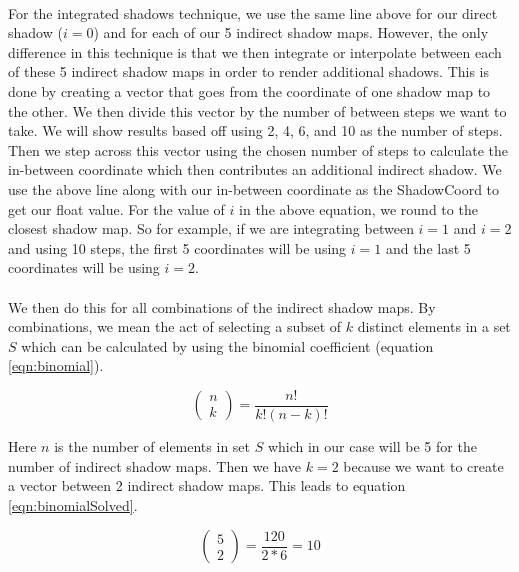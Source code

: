 \paragraph{}
For the integrated shadows technique, we use the same line above for our direct shadow ($i=0$) and for each of our 5 indirect shadow maps.  However, the only difference in this technique is that we then integrate or interpolate between each of these 5 indirect shadow maps in order to render additional shadows.  This is done by creating a vector that goes from the coordinate of one shadow map to the other.  We then divide this vector by the number of between steps we want to take.  We will show results based off using 2, 4, 6, and 10 as the number of steps. Then we step across this vector using the chosen number of steps to calculate the in-between coordinate which then contributes an additional indirect shadow.  We use the above line along with our in-between coordinate as the ShadowCoord to get our float value.  For the value of $i$ in the above equation, we round to the closest shadow map. So for example, if we are integrating between $i=1$ and $i=2$ and using 10 steps, the first 5 coordinates will be using $i=1$ and the last 5 coordinates will be using $i=2$.

\paragraph{}
We then do this for all combinations of the indirect shadow maps.  By combinations, we mean the act of selecting a subset of $k$ distinct elements in a set $S$ which can be calculated by using the binomial coefficient (equation \ref{eqn:binomial}).

\begin{equation}
\left(
    \begin{array}{c}
      n \\
      k
    \end{array}
  \right) = \frac{n!}{k!(n-k)!} \label{eqn:binomial}
\end{equation}

Here $n$ is the number of elements in set $S$ which in our case will be 5 for the number of indirect shadow maps.  Then we have $k=2$ because we want to create a vector between 2 indirect shadow maps.  This leads to equation \ref{eqn:binomialSolved}.

\begin{equation}
\left(
    \begin{array}{c}
      5 \\
      2
    \end{array}
  \right) = \frac{120}{2*6} = 10\label{eqn:binomialSolved}
\end{equation}

